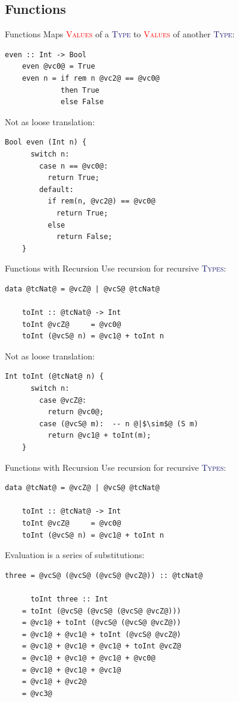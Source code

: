 \documentclass[xcolor={usenames,dvipsnames}]{beamer}
\newcommand{\htycon}[1]{\textcolor{MidnightBlue}{\textsc{#1}}}
\newcommand{\hvalcon}[1]{\textcolor{Red}{\textsc{#1}}}
\begin{document}
\subsection{Functions}

\begin{frame}[fragile]{Functions}
  Maps \hvalcon{Values} of a \htycon{Type} to \hvalcon{Values} of another \htycon{Type}:
  \begin{lstlisting}[style=hask]
    even :: Int -> Bool
    even @vc0@ = True
    even n = if rem n @vc2@ == @vc0@
             then True
             else False
  \end{lstlisting}

  \pause
  Not as loose translation:
  \begin{lstlisting}[style=hask]
    Bool even (Int n) {
      switch n:
        case n == @vc0@:
          return True;
        default:
          if rem(n, @vc2@) == @vc0@
            return True;
          else
            return False;
    }
  \end{lstlisting}
\end{frame}

\begin{frame}[fragile]{Functions with Recursion}
  Use recursion for recursive \htycon{Types}:
  \begin{lstlisting}[style=hask]
    data @tcNat@ = @vcZ@ | @vcS@ @tcNat@

    toInt :: @tcNat@ -> Int
    toInt @vcZ@     = @vc0@
    toInt (@vcS@ n) = @vc1@ + toInt n
  \end{lstlisting}

  \pause
  Not as loose translation:
  \begin{lstlisting}[style=hask]
    Int toInt (@tcNat@ n) {
      switch n:
        case @vcZ@:
          return @vc0@;
        case (@vcS@ m):  -- n @|$\sim$@ (S m)
          return @vc1@ + toInt(m);
    }
  \end{lstlisting}
\end{frame}

\begin{frame}[fragile]{Functions with Recursion}
  Use recursion for recursive \htycon{Types}:
  \begin{lstlisting}[style=hask]
    data @tcNat@ = @vcZ@ | @vcS@ @tcNat@

    toInt :: @tcNat@ -> Int
    toInt @vcZ@     = @vc0@
    toInt (@vcS@ n) = @vc1@ + toInt n
  \end{lstlisting}

  Evaluation is a series of substitutions:
  \begin{lstlisting}[style=hask]
    three = @vcS@ (@vcS@ (@vcS@ @vcZ@)) :: @tcNat@

      toInt three :: Int
    = toInt (@vcS@ (@vcS@ (@vcS@ @vcZ@)))
    = @vc1@ + toInt (@vcS@ (@vcS@ @vcZ@))
    = @vc1@ + @vc1@ + toInt (@vcS@ @vcZ@)
    = @vc1@ + @vc1@ + @vc1@ + toInt @vcZ@
    = @vc1@ + @vc1@ + @vc1@ + @vc0@
    = @vc1@ + @vc1@ + @vc1@
    = @vc1@ + @vc2@
    = @vc3@
  \end{lstlisting}
\end{frame}
\end{document}
